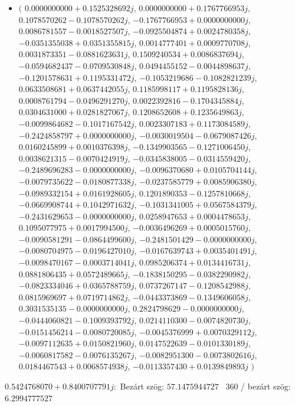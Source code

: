 \documentclass[14pt,a4paper]{article}
\begin{document}
\begin{itemize}
\item
$\big($
$0.0000000000+0.1525328692j$, $0.0000000000+0.1767766953j$, $0.1078570262-0.1078570262j$, $-0.1767766953+0.0000000000j$, $0.0086781557-0.0018527507j$, $-0.0925504874+0.0024780358j$, $-0.0351355038+0.0351355815j$, $0.0014777401+0.0009770708j$, $0.0031873351-0.0881623631j$, $0.1509240534+0.0086837694j$, $-0.0594682437-0.0709530848j$, $0.0494455152-0.0044898637j$, $-0.1201578631+0.1195331472j$, $-0.1053219686-0.1082821239j$, $0.0633508681+0.0637442055j$, $0.1185998117+0.1195828136j$, $0.0008761794-0.0496291270j$, $0.0022392816-0.1704345884j$, $0.0304631000+0.0281827067j$, $0.1208652608+0.1235649863j$, $-0.0099864682-0.1017167542j$, $0.0023307183+0.1173084589j$, $-0.2424858797+0.0000000000j$, $-0.0030019504-0.0679087426j$, $0.0160245899+0.0010376398j$, $-0.1349903565-0.1271006450j$, $0.0038621315-0.0070424919j$, $-0.0345838005-0.0314559420j$, $-0.2489696283-0.0000000000j$, $-0.0096370680+0.0105704144j$, $-0.0079735622-0.0180877338j$, $-0.0237585779+0.0085906380j$, $-0.0989332154+0.0161928605j$, $0.1201890353-0.1257810668j$, $-0.0669908744+0.1042971632j$, $-0.1031341005+0.0567584379j$, $-0.2431629653-0.0000000000j$, $0.0258947653+0.0004478653j$, $0.1095077975+0.0017994500j$, $-0.0036496269+0.0005015760j$, $-0.0090581291-0.0864499600j$, $-0.2481501429-0.0000000000j$, $-0.0080704975-0.0196427010j$, $-0.0167639743+0.0035401491j$, $-0.0098470167-0.0003714041j$, $0.0985206374+0.0134416731j$, $0.0881806435+0.0572489665j$, $-0.1838150295-0.0382290982j$, $-0.0823334046+0.0365788759j$, $0.0737267147-0.1208542988j$, $0.0815969697+0.0719714862j$, $-0.0443373869-0.1349606058j$, $0.3031535135-0.0000000000j$, $0.2824798629-0.0000000000j$, $-0.0444060821-0.1009393792j$, $0.0214110300-0.0074820730j$, $-0.0151456214-0.0080720085j$, $-0.0045376999+0.0070329112j$, $-0.0097112635+0.0150821960j$, $0.0147522639-0.0101330189j$, $-0.0060817582-0.0076135267j$, $-0.0082951300-0.0073802616j$, $0.0184467543+0.0068574938j$, $-0.0113357430+0.0139849893j$
$\big)$
\end{itemize}
$0.5424768070+0.8400707791j$:\
Bezárt szög: $57.1475944727$ \
360 / bezárt szög: $6.2994777527$\
\end{document}
